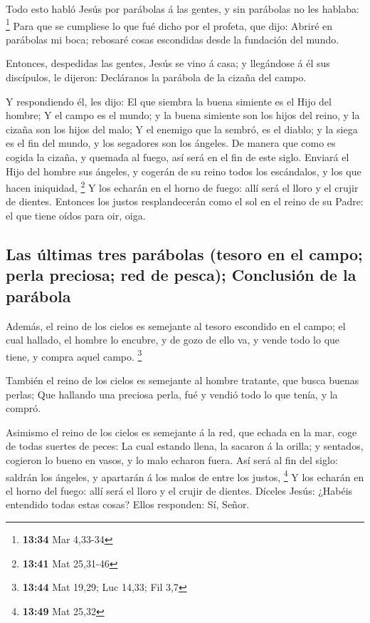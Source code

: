  Todo esto habló Jesús por parábolas á las gentes, y sin
parábolas no les hablaba: \footnote{\textbf{13:34} Mar 4,33-34}
 Para que se cumpliese lo que fué dicho por el profeta, que
dijo: Abriré en parábolas mi boca; rebosaré cosas escondidas desde la
fundación del mundo.

 Entonces, despedidas las gentes, Jesús se vino á casa; y
llegándose á él sus discípulos, le dijeron: Decláranos la parábola de la
cizaña del campo.

 Y respondiendo él, les dijo: El que siembra la buena
simiente es el Hijo del hombre;  Y el campo es el mundo; y
la buena simiente son los hijos del reino, y la cizaña son los hijos del
malo;  Y el enemigo que la sembró, es el diablo; y la siega
es el fin del mundo, y los segadores son los ángeles.  De
manera que como es cogida la cizaña, y quemada al fuego, así será en el
fin de este siglo.  Enviará el Hijo del hombre sus ángeles,
y cogerán de su reino todos los escándalos, y los que hacen iniquidad,
\footnote{\textbf{13:41} Mat 25,31-46}  Y los echarán en el
horno de fuego: allí será el lloro y el crujir de dientes. 
Entonces los justos resplandecerán como el sol en el reino de su Padre:
el que tiene oídos para oir, oiga.

\hypertarget{las-uxfaltimas-tres-paruxe1bolas-tesoro-en-el-campo-perla-preciosa-red-de-pesca-conclusiuxf3n-de-la-paruxe1bola}{%
\subsection{Las últimas tres parábolas (tesoro en el campo; perla
preciosa; red de pesca); Conclusión de la
parábola}\label{las-uxfaltimas-tres-paruxe1bolas-tesoro-en-el-campo-perla-preciosa-red-de-pesca-conclusiuxf3n-de-la-paruxe1bola}}

 Además, el reino de los cielos es semejante al tesoro
escondido en el campo; el cual hallado, el hombre lo encubre, y de gozo
de ello va, y vende todo lo que tiene, y compra aquel campo. \footnote{\textbf{13:44}
  Mat 19,29; Luc 14,33; Fil 3,7}

 También el reino de los cielos es semejante al hombre
tratante, que busca buenas perlas;  Que hallando una
preciosa perla, fué y vendió todo lo que tenía, y la compró.

 Asimismo el reino de los cielos es semejante á la red, que
echada en la mar, coge de todas suertes de peces:  La cual
estando llena, la sacaron á la orilla; y sentados, cogieron lo bueno en
vasos, y lo malo echaron fuera.  Así será al fin del siglo:
saldrán los ángeles, y apartarán á los malos de entre los justos,
\footnote{\textbf{13:49} Mat 25,32}  Y los echarán en el
horno del fuego: allí será el lloro y el crujir de dientes.
 Díceles Jesús: ¿Habéis entendido todas estas cosas? Ellos
responden: Sí, Señor.


